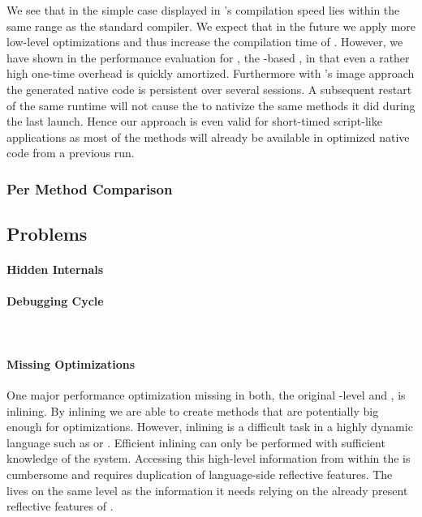 We see that in the simple case displayed in  \NBJ's compilation speed lies within the same range as the standard \ST compiler.
We expect that in the future we apply more low-level optimizations and thus increase the compilation time of \NBJ.
However, we have shown in the performance evaluation for \NB, the \B-based \FFI, in  that even a rather high one-time overhead is quickly amortized.
Furthermore with \ST's image approach the generated native code is persistent over several sessions.
A subsequent restart of the same runtime will not cause the \JIT to nativize the same methods it did during the last launch.
Hence our approach is even valid for short-timed script-like applications as most of the methods will already be available in optimized native code from a previous run.

\subsubsection*{Per Method Comparison}


\subsection{Problems}
\paragraph{Hidden \VM Internals}

\paragraph{Debugging Cycle}
 \\

\paragraph{Missing Optimizations}
One major performance optimization missing in both, the original \PH \VM-level \JIT and \NBJ, is inlining. 
By inlining we are able to create methods that are potentially big enough for optimizations.
However, inlining is a difficult task in a highly dynamic language such as \ST or \Self \cite{Cham89a}. 
Efficient inlining can only be performed with sufficient knowledge of the system. 
Accessing this high-level information from within the \VM is cumbersome and requires duplication of language-side reflective features.
The \JIT lives on the same level as the information it needs relying on the already present reflective features of \ST.


